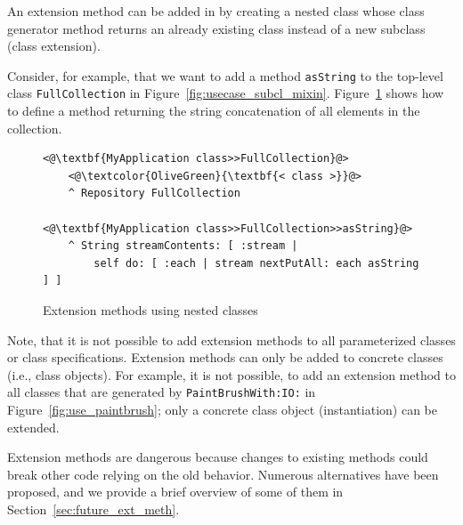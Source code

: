 An extension method can be added in \msname by creating a nested class whose class generator method returns an already existing class instead of a new subclass (class extension).

Consider, for example, that we want to add a method \texttt{asString} to the top-level class \texttt{FullCollection} in Figure~\ref{fig:usecase_subcl_mixin}. Figure~\ref{fig:use_ext_meth} shows how to define a method returning the string concatenation of all elements in the collection.

\begin{figure}[!htp]
\begin{lstlisting}
<@\textbf{MyApplication class>>FullCollection}@>
    <@\textcolor{OliveGreen}{\textbf{< class >}}@>
    ^ Repository FullCollection

<@\textbf{MyApplication class>>FullCollection>>asString}@>
    ^ String streamContents: [ :stream |
        self do: [ :each | stream nextPutAll: each asString ] ]
\end{lstlisting}
\caption{Extension methods using nested classes}
\label{fig:use_ext_meth}
\end{figure}

Note, that it is not possible to add extension methods to all parameterized classes or class specifications. Extension methods can only be added to concrete classes (i.e., class objects). For example, it is not possible, to add an extension method to all classes that are generated by \texttt{PaintBrushWith:IO:} in Figure~\ref{fig:use_paintbrush}; only a concrete class object (instantiation) can be extended.

Extension methods are dangerous because changes to existing methods could break other code relying on the old behavior. Numerous alternatives have been proposed, and we provide a brief overview of some of them in Section~\ref{sec:future_ext_meth}.
